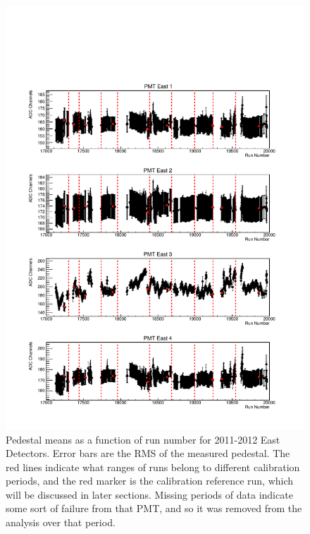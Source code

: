 \begin{figure}[p]
\centering
\includegraphics[page=1,scale=0.8]{3-UCNAAnalysis/2011-2012_pedestals.pdf}
\caption{Pedestal means as a function of run number for 2011-2012 East Detectors. Error bars are the
  RMS of the measured pedestal. The red lines indicate what ranges of runs belong to
  different calibration periods, and the red marker is the calibration reference run,
  which will be discussed in later sections. Missing periods of data indicate some sort of failure
  from that PMT, and so it was removed from the analysis over that period.}
 \label{fig:peds_timeDep}
\end{figure}

